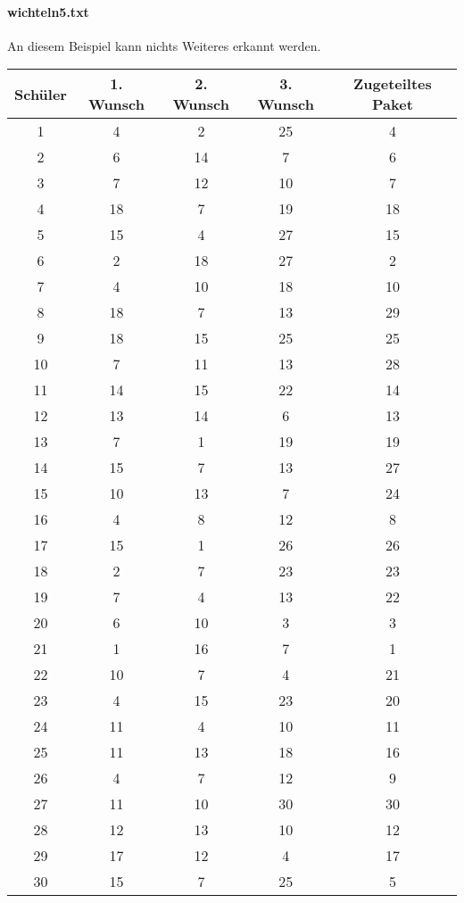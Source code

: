 \documentclass[a4paper,10pt,ngerman]{scrartcl}
\begin{document}
\paragraph{wichteln5.txt}
An diesem Beispiel kann nichts Weiteres erkannt werden.
\begin{longtable}[c]{c|c|c|c|c}
    Schüler & 1. Wunsch & 2. Wunsch & 3. Wunsch & Zugeteiltes Paket \\
    \hline
    \endhead
    1 & 4 & 2 & 25 & 4 \\
    2 & 6 & 14 & 7 & 6 \\
    3 & 7 & 12 & 10 & 7 \\
    4 & 18 & 7 & 19 & 18 \\
    5 & 15 & 4 & 27 & 15 \\
    6 & 2 & 18 & 27 & 2 \\
    7 & 4 & 10 & 18 & 10 \\
    8 & 18 & 7 & 13 & 29 \\
    9 & 18 & 15 & 25 & 25 \\
    10 & 7 & 11 & 13 & 28 \\
    11 & 14 & 15 & 22 & 14 \\
    12 & 13 & 14 & 6 & 13 \\
    13 & 7 & 1 & 19 & 19 \\
    14 & 15 & 7 & 13 & 27 \\
    15 & 10 & 13 & 7 & 24 \\
    16 & 4 & 8 & 12 & 8 \\
    17 & 15 & 1 & 26 & 26 \\
    18 & 2 & 7 & 23 & 23 \\
    19 & 7 & 4 & 13 & 22 \\
    20 & 6 & 10 & 3 & 3 \\
    21 & 1 & 16 & 7 & 1 \\
    22 & 10 & 7 & 4 & 21 \\
    23 & 4 & 15 & 23 & 20 \\
    24 & 11 & 4 & 10 & 11 \\
    25 & 11 & 13 & 18 & 16 \\
    26 & 4 & 7 & 12 & 9 \\
    27 & 11 & 10 & 30 & 30 \\
    28 & 12 & 13 & 10 & 12 \\
    29 & 17 & 12 & 4 & 17 \\
    30 & 15 & 7 & 25 & 5
\end{longtable}
\end{document}

